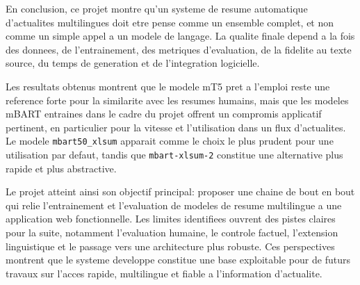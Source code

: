 En conclusion, ce projet montre qu'un systeme de resume automatique d'actualites multilingues doit etre pense comme un ensemble complet, et non comme un simple appel a un modele de langage. La qualite finale depend a la fois des donnees, de l'entrainement, des metriques d'evaluation, de la fidelite au texte source, du temps de generation et de l'integration logicielle.

Les resultats obtenus montrent que le modele mT5 pret a l'emploi reste une reference forte pour la similarite avec les resumes humains, mais que les modeles mBART entraines dans le cadre du projet offrent un compromis applicatif pertinent, en particulier pour la vitesse et l'utilisation dans un flux d'actualites. Le modele \texttt{mbart50\_xlsum} apparait comme le choix le plus prudent pour une utilisation par defaut, tandis que \texttt{mbart-xlsum-2} constitue une alternative plus rapide et plus abstractive.

Le projet atteint ainsi son objectif principal: proposer une chaine de bout en bout qui relie l'entrainement et l'evaluation de modeles de resume multilingue a une application web fonctionnelle. Les limites identifiees ouvrent des pistes claires pour la suite, notamment l'evaluation humaine, le controle factuel, l'extension linguistique et le passage vers une architecture plus robuste. Ces perspectives montrent que le systeme developpe constitue une base exploitable pour de futurs travaux sur l'acces rapide, multilingue et fiable a l'information d'actualite.
